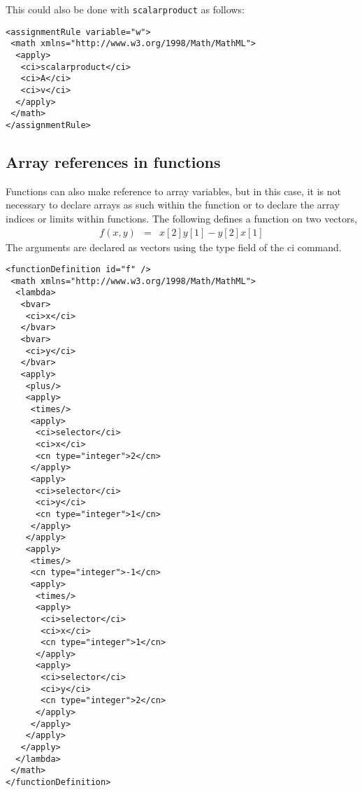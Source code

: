 This could also be done with {\tt scalarproduct} as follows:

\begin{verbatim}
<assignmentRule variable="w">
 <math xmlns="http://www.w3.org/1998/Math/MathML">
  <apply>
   <ci>scalarproduct</ci>
   <ci>A</ci>
   <ci>v</ci>
  </apply>
 </math>
</assignmentRule>
\end{verbatim}

\subsection{Array references in functions}

Functions can also make reference to array variables, but in this case, it is not necessary to declare arrays as such within the function or to declare the array indices or limits within functions.  The following defines a function on two vectors, 
\begin{eqnarray*}
f(x,y) & = & x[2]y[1] - y[2]x[1]
\end{eqnarray*}
The arguments are declared as vectors using the type field of the ci command.
\begin{verbatim}
<functionDefinition id="f" />
 <math xmlns="http://www.w3.org/1998/Math/MathML">
  <lambda>
   <bvar>
    <ci>x</ci>
   </bvar>
   <bvar>
    <ci>y</ci>
   </bvar>
   <apply>
    <plus/>
    <apply>
     <times/>
     <apply>
      <ci>selector</ci>
      <ci>x</ci>
      <cn type="integer">2</cn>
     </apply>
     <apply>
      <ci>selector</ci>
      <ci>y</ci>
      <cn type="integer">1</cn>
     </apply>
    </apply>
    <apply>
     <times/>
     <cn type="integer">-1</cn>
     <apply>
      <times/>
      <apply>
       <ci>selector</ci>
       <ci>x</ci>
       <cn type="integer">1</cn>
      </apply>
      <apply>
       <ci>selector</ci>
       <ci>y</ci>
       <cn type="integer">2</cn>
      </apply>
     </apply>
    </apply>
   </apply>
  </lambda>
 </math>
</functionDefinition>
\end{verbatim}




